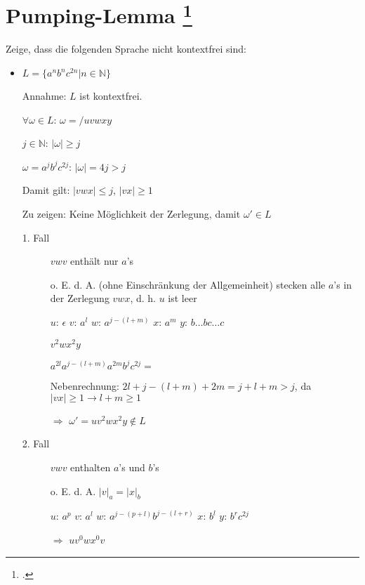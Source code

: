 \documentclass{lehramt-informatik-aufgabe}
\begin{document}
\section{Pumping-Lemma
\footcite[Seite 43]{theo:fs:2}}

Zeige, dass die folgenden Sprache nicht kontextfrei sind:

\begin{itemize}
\item $L = \{ a^n b^n c^{2n} | n \in \mathbb{N} \}$

\begin{liAntwort}
Annahme: $L$ ist kontextfrei.

$\forall \omega \in L$: $\omega = / uvwxy$

$j \in \mathbb{N}$: $|\omega| \geq j$

$\omega = a^j b^j c^{2j}$: $|\omega| = 4j > j$

Damit gilt: $|vwx| \leq j$, $|vx| \geq 1$

Zu zeigen: Keine Möglichkeit der Zerlegung, damit $\omega' \in L$

\begin{description}

%

\item[1. Fall]

$vwv$ enthält nur $a$'s

o. E. d. A. (ohne Einschränkung der Allgemeinheit) stecken alle $a$'s in
der Zerlegung $vwx$, d. h. $u$ ist leer

$u$: $\epsilon$
$v$: $a^l$
$w$: $a^{j-(l+m)}$
$x$: $a^m$
$y$: $b\dots b c \dots c$

$v^2 w x^2 y$

$a^{2l} a^{j-(l+m)} a^{2m} b^j c^{2j} =   $

Nebenrechnung: $2l + j - (l + m) + 2m = j + l + m > j$,
da $|vx| \geq 1 \rightarrow l + m \geq 1$

$\Rightarrow$ $\omega' = uv^2wx^2y \notin L$

%

\item[2. Fall]

$vwv$ enthalten $a$'s und $b$'s

o. E. d. A. $|v|_a = |x|_b$

$u$: $a^p$
$v$: $a^l$
$w$: $a^{j-(p+l)} b^{j-(l+r)}$
$x$: $b^l$
$y$: $b^r c^{2j}$

$\Rightarrow$ $u v^0 w x^0 v$


\end{description}
\end{liAntwort}
\end{itemize}
\end{document}

